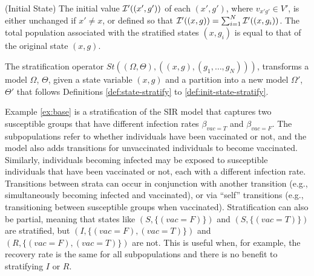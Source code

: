 \begin{definition} (Initial State)\label{def:init-state-stratify}
	The initial value ${\cal I}'((x',g'))$ of each $(x', g')$, where $v_{x'g'}\in V'$, is either unchanged if $x' \not=x$, or defined so that ${\cal I}'((x,g)) = \sum_{i=1}^N {\cal I}'((x,g_i))$.  The total population associated with the stratified states $(x, g_i)$  is equal to that of the original state $(x,g)$.
\end{definition}

\begin{definition}
	The stratification operator $St((\Omega, \Theta), ((x, g), (g_1, \ldots, g_N)))$,
	transforms a model $\Omega$, $\Theta$, given a state variable $(x, g)$ and a partition into a new model $\Omega'$, $\Theta'$ that follows Definitions \ref{def:state-stratify} to \ref{def:init-state-stratify}.

\end{definition}

Example \ref{ex:base} is a stratification of the SIR model that
captures two susceptible groups that have different infection rates $\beta_{vac=T}$
and $\beta_{vac=F}$.  The subpopulations refer to whether individuals have
been vaccinated or not, and the model also adds transitions for unvaccinated individuals to
become vaccinated. Similarly, individuals becoming infected may be exposed to
susceptible individuals that have been vaccinated or not, each with a different
infection rate.  Transitions between strata can occur in conjunction with
another transition (e.g., simultaneously becoming infected and vaccinated), or
via ``self'' transitions (e.g., transitioning between susceptible groups when
vaccinated). Stratification can also be partial, meaning that states like $(S, \{(vac=F)\})$
and $(S, \{(vac=T)\})$ are stratified, but $(I, \{(vac=F), (vac=T)\})$ and $(R, \{(vac=F), (vac=T)\})$ are not.  This is useful when, for
example, the recovery rate is the same for all subpopulations and there is no
benefit to stratifying $I$ or $R$.



